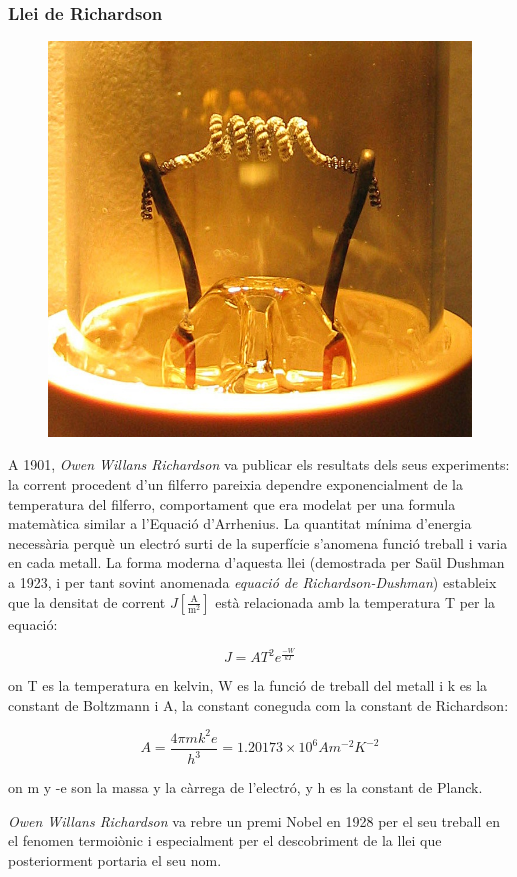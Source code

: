 \documentclass[11pt]{article}
\begin{document}
        \vspace{0.5cm}
        \subsubsection*{Llei de Richardson}

        \begin{figure}
            \vspace{-0.7cm}
            \begin{center}
                \includegraphics[width=.24\textwidth]{fotos/filament.jpg}
            \end{center}
        \end{figure}

        \vspace{0.4cm}A 1901, \textit{Owen Willans Richardson} va publicar els resultats dels seus experiments: la corrent procedent d'un filferro pareixia dependre exponencialment de la temperatura del filferro, comportament que era modelat per una formula matemàtica similar a l'Equació d'Arrhenius. La quantitat mínima d'energia necessària perquè un electró surti de la superfície s'anomena funció treball i varia en cada metall. La forma moderna d'aquesta llei (demostrada per Saül Dushman a 1923, i per tant sovint anomenada \textit{equació de Richardson-Dushman}) estableix que la densitat de corrent $J\left[\frac{\si{\ampere}}{\si{\meter}^2}\right]$ està relacionada amb la temperatura T per la equació:
        
        \hspace{0cm}\[J=AT^2e^{\frac{-W}{kT}}\]

        on T es la temperatura en kelvin, W es la funció de treball del metall i k es la constant de Boltzmann i A, la constant coneguda com la constant de Richardson:

        \[A=\frac{4\pi mk^2e}{h^3}=1.20173\times10^6 Am^{-2}K^{-2}\]
        
        on m y -e son la massa y la càrrega de l'electró, y h es la constant de Planck.

    
        \vspace{0.4cm}\textit{Owen Willans Richardson} va rebre un premi Nobel en 1928 per el seu treball en el fenomen termoiònic i especialment per el descobriment de la llei que posteriorment portaria el seu nom.
\end{document}
